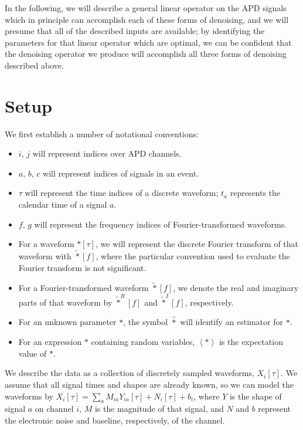 In the following, we will describe a general linear operator on the APD signals which in principle can accomplish each of these forms of denoising, and we will presume that all of the described inputs are available; by identifying the parameters for that linear operator which are optimal, we can be confident that the denoising operator we produce will accomplish all three forms of denoising described above.

\section{Setup}

We first establish a number of notational conventions:
\begin{itemize}
\item $i$, $j$ will represent indices over APD channels.
\item $a$, $b$, $c$ will represent indices of signals in an event.
\item $\tau$ will represent the time indices of a discrete waveform; $t_a$ represents the calendar time of a signal $a$.
\item $f$, $g$ will represent the frequency indices of Fourier-transformed waveforms.
\item For a waveform $*[\tau]$, we will represent the discrete Fourier transform of that waveform with $\widetilde{*}[f]$, where the particular convention used to evaluate the Fourier transform is not significant.
\item For a Fourier-transformed waveform $\widetilde{*}[f]$, we denote the real and imaginary parts of that waveform by $\widetilde{*}^R[f]$ and $\widetilde{*}^I[f]$, respectively.
\item For an unknown parameter $*$, the symbol $\widehat{*}$ will identify an estimator for $*$.
\item For an expression $*$ containing random variables, $\left<*\right>$ is the expectation value of $*$.
\end{itemize}

We describe the data as a collection of discretely sampled waveforms, $X_i[\tau]$.  We assume that all signal times and shapes are already known, so we can model the waveforms by $X_i[\tau] = \sum_a M_{ia}Y_{ia}[\tau] + N_i[\tau] + b_i$, where $Y$ is the shape of signal $a$ on channel $i$, $M$ is the magnitude of that signal, and $N$ and $b$ represent the electronic noise and baseline, respectively, of the channel.

